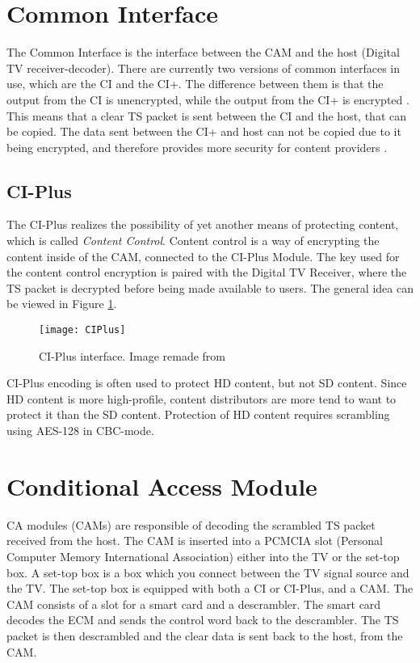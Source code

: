\section{Common Interface} \label{sec:CI}
The Common Interface is the interface between the CAM and the host 
(Digital TV receiver-decoder). There are currently two versions of 
common interfaces in use, which are the CI and the CI+. The difference 
between them is that the output from the CI is unencrypted, while the 
output from the CI+ is encrypted \citep{CI+:2011}. This means that a 
clear TS packet is sent between the CI and the host, that can be 
copied. The data sent between the CI+ and host can not be copied due 
to it being encrypted, and therefore provides more security for 
content providers \citep{CI:1997}.

\subsection{CI-Plus}
The CI-Plus realizes the possibility of yet another means of protecting 
content, which is called \emph{Content Control}. Content control is a 
way of encrypting the content inside of the CAM, connected to the 
CI-Plus Module. The key used for the content control encryption is 
paired with the Digital TV Receiver, where the TS packet is decrypted 
before being made available to users. The general idea can be viewed 
in Figure \ref{img:CIPlus}.

\begin{figure}[h!]
  \centering
  \texttt{[image: CIPlus]}
  \caption{CI-Plus interface. Image remade from \citep[p. 10]{CI+:2011}}
  \label{img:CIPlus}
\end{figure}

CI-Plus encoding is often used to protect HD content, but not SD 
content. Since HD content is more high-profile, content distributors 
are more tend to want to protect it than the SD content. Protection of 
HD content requires scrambling using AES-128 in CBC-mode. 
\citep{CI+:2011, CI+:2011_2}

\section{Conditional Access Module}\label{sec:CAM}
CA modules (CAMs) are responsible of decoding the scrambled TS packet
received from the host. The CAM is inserted into a PCMCIA slot 
(Personal Computer Memory International Association) either into the TV 
or the set-top box. A set-top box is a box which you connect between 
the TV signal source and the TV. The set-top box is equipped with both 
a CI or CI-Plus, and a CAM. The CAM consists of a slot for a 
smart card and a descrambler. The smart card decodes the ECM and sends 
the control word back to the descrambler. The TS packet is then 
descrambled and the clear data is sent back to the host, from the CAM.
